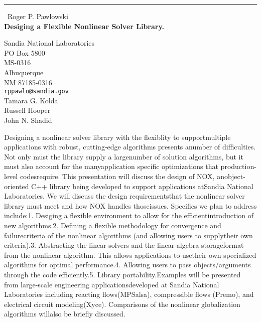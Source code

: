 \documentclass{report}
\begin{document}
\begin{center}
\rule{6in}{1pt} \
{\large Roger P. Pawlowski \\
{\bf Desiging a Flexible Nonlinear Solver Library.}}

Sandia National Laboratories \\ PO Box 5800 \\ MS-0316 \\ Albuquerque \\ NM 87185-0316
\\
{\tt rppawlo@sandia.gov}\\
Tamara G. Kolda\\
Russell Hooper\\
	John N. Shadid\end{center}

Designing a nonlinear solver library with the flexiblity to supportmultiple applications with robust,
cutting-edge algorithms presents anumber of difficulties.
Not only must the library supply a largenumber of solution algorithms,
but it must also account for the manyapplication specific optimizations that production-level codesrequire.
This presentation will discuss the design of NOX,
anobject-oriented C++ library being developed to support applications atSandia National Laboratories.
We will discuss the design requirementsthat the nonlinear solver library must meet and how NOX handles thoseissues.
Specifics we plan to address include:1.
Desiging a flexible environment to allow for the efficientintroduction of new algorithms.2.
Defining a flexible methodology for convergence and failurecriteria of the nonlinear algorithms (and allowing users to supplytheir own criteria).3.
Abstracting the linear solvers and the linear algebra storageformat from the nonlinear algorithm.
This allows applications to usetheir own specialized algorithms for optimal performance.4.
Allowing users to pass objects/arguments through the code efficiently.5.
Library portability.Examples will be presented from large-scale engineering applicationsdeveloped at Sandia National Laboratories including reacting flows(MPSalsa),
compressible flows (Premo),
and electrical circuit modeling(Xyce).
Comparisons of the nonlinear globalization algorithms willalso be briefly discussed.
\end{document}
